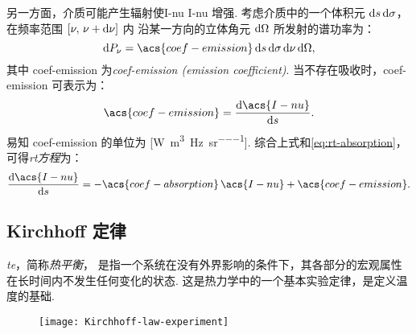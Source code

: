另一方面，介质可能产生辐射使\acl{I-nu} \acs{I-nu} 增强.
考虑介质中的一个体积元 $\mathrm{d}s\,\mathrm{d}\sigma$，在频率范围 $[\nu, \,\nu+\mathrm{d}\nu]$ 内
沿某一方向的立体角元 $\mathrm{d}\Omega$ 所发射的谱功率为：
\begin{equation}
  \D{P_{\nu}} =
    \acs{coef-emission} \,\D{s}\,\D{\sigma}\,\D{\nu}\,\D{\Omega} ,
\end{equation}
其中 \acs{coef-emission} 为\emph{\acl{coef-emission} (emission coefficient)}.
当不存在吸收时，\acs{coef-emission} 可表示为：
\begin{equation}
  \label{eq:coef-emission}
  \acs{coef-emission} = \diff{\acs{I-nu}}{s} .
\end{equation}
易知 \acs{coef-emission} 的单位为
[\si{\watt\per\cubic\meter\per\hertz\per\steradian}].
综合上式和\autoref{eq:rt-absorption}，可得\emph{\ac{rt}方程}为：
\begin{equation}
  \label{eq:radiative-transfer}
  \diff{\acs{I-nu}}{s} =
    - \acs{coef-absorption} \,\acs{I-nu} + \acs{coef-emission} .
\end{equation}

\subsection{Kirchhoff 定律}

\emph{\acf{te}}，简称\emph{热平衡}，
是指一个系统在没有外界影响的条件下，其各部分的宏观属性在长时间内不发生任何变化的状态.
这是热力学中的一个基本实验定律，是定义温度的基础.

\begin{figure}[htp]
  \centering
  \texttt{[image: Kirchhoff-law-experiment]}
  \label{fig:kirchhoff-experiment}
\end{figure}

